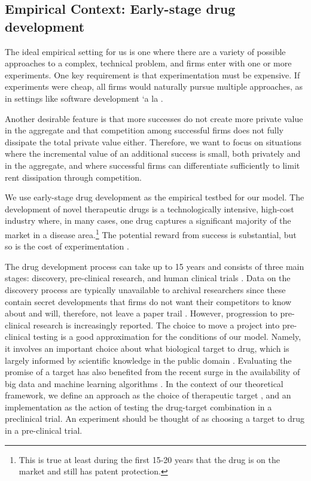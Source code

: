 
\subsection{Empirical Context: Early-stage drug development}


The ideal empirical setting for us is one where there are a variety of possible approaches to a complex, technical problem, and firms enter with one or more experiments. One key requirement is that experimentation must be expensive. If experiments were cheap, all firms would naturally pursue multiple approaches, as in settings like software development `a la \citet{koning2022experimentation}. 

Another desirable feature is that more successes do not create more private value in the aggregate and that competition among successful firms does not fully dissipate the total private value either. Therefore, we want to focus on situations where the incremental value of an additional success is small, both privately and in the aggregate, and where successful firms can differentiate sufficiently to limit rent dissipation through competition.

We use early-stage drug development as the empirical testbed for our model. The development of novel therapeutic drugs is a technologically intensive, high-cost industry where, in many cases, one drug captures a significant majority of the market in a disease area.\footnote{This is true at least during the first 15-20 years that the drug is on the market and still has patent protection.} The potential reward from success is substantial, but so is the cost of experimentation \citep{dimasi2016innovation}.

The drug development process can take up to 15 years \citep{hughes2011principles} and consists of three main stages: discovery, pre-clinical research, and human clinical trials \citep{frankel2023evaluation}. Data on the discovery process are typically unavailable to archival researchers since these contain secret developments that firms do not want their competitors to know about and will, therefore, not leave a paper trail \citep{krieger2022missing}. However, progression to pre-clinical research is increasingly reported. The choice to move a project into pre-clinical testing is a good approximation for the conditions of our model. Namely, it involves an important choice about what biological target to drug, which is largely informed by scientific knowledge in the public domain \citep{knowles2003target}. Evaluating the promise of a target has also benefited from the recent surge in the availability of big data \citep{chen2016leveraging} and machine learning algorithms \citep{dara2022machine}. In the context of our theoretical framework, we define an approach as the choice of therapeutic target \citep{thomke1998modes, tranchero2023finding}, and an implementation as the action of testing the drug-target combination in a preclinical trial. An experiment should be thought of as choosing a target to drug in a pre-clinical trial.

